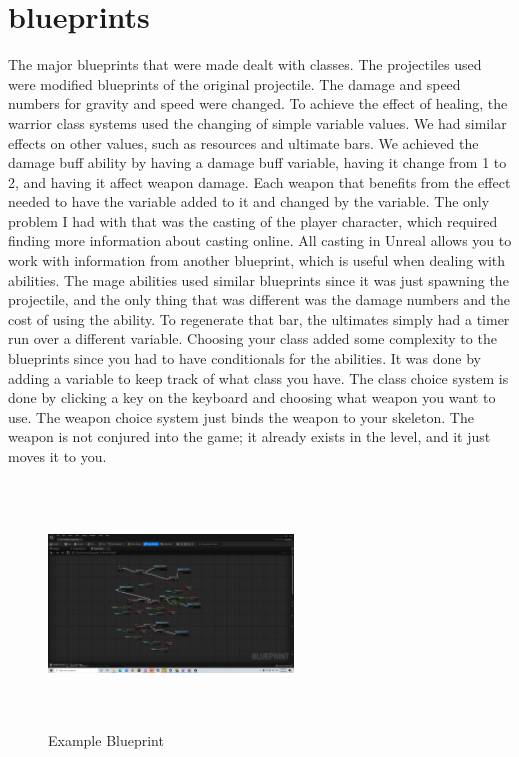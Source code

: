 \documentclass{sigchi}
\begin{document}
\section{blueprints}
The major blueprints that were made dealt with classes. The projectiles used were modified blueprints of the original projectile. The damage and speed numbers for gravity and speed were changed. To achieve the effect of healing, the warrior class systems used the changing of simple variable values. We had similar effects on other values, such as resources and ultimate bars. We achieved the damage buff ability by having a damage buff variable, having it change from 1 to 2, and having it affect weapon damage. Each weapon that benefits from the effect needed to have the variable added to it and changed by the variable. The only problem I had with that was the casting of the player character, which required finding more information about casting online. All casting in Unreal allows you to work with information from another blueprint, which is useful when dealing with abilities. The mage abilities used similar blueprints since it was just spawning the projectile, and the only thing that was different was the damage numbers and the cost of using the ability. To regenerate that bar, the ultimates simply had a timer run over a different variable. Choosing your class added some complexity to the blueprints since you had to have conditionals for the abilities. It was done by adding a variable to keep track of what class you have. The class choice system is done by clicking a key on the keyboard and choosing what weapon you want to use. The weapon choice system just binds the weapon to your skeleton. The weapon is not conjured into the game; it already exists in the level, and it just moves it to you.
\begin{figure}
\includegraphics[width=6.5cm, height=6.5cm]{Figure/blueprint.png}
\caption{Example Blueprint}
\end{figure}
\end{document}

